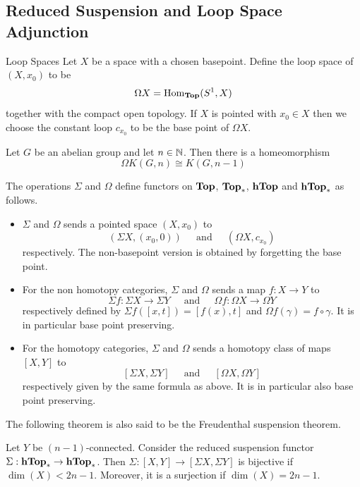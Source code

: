 \documentclass[a4paper]{article}
\begin{document}
\subsection{Reduced Suspension and Loop Space Adjunction}
\begin{defn}{Loop Spaces}{} Let $X$ be a space with a chosen basepoint. Define the loop space of $(X,x_0)$ to be $$\Omega X=\operatorname{Hom}_\bold{Top}(S^1,X)$$ together with the compact open topology. If $X$ is pointed with $x_0\in X$ then we choose the constant loop $c_{x_0}$ to be the base point of $\Omega X$. 
\end{defn}

\begin{lmm}{}{} Let $G$ be an abelian group and let $n\in\mathbb{N}$. Then there is a homeomorphism $$\Omega K(G,n)\cong K(G,n-1)$$
\end{lmm}

\begin{thm}{}{} The operations $\Sigma$ and $\Omega$ define functors on $\bold{Top}$, $\bold{Top}_\ast$, $\bold{hTop}$ and $\bold{hTop}_\ast$ as follows. 
\begin{itemize}
\item $\Sigma$ and $\Omega$ sends a pointed space $(X,x_0)$ to $$(\Sigma X,(x_0,0))\;\;\;\;\text{ and }\;\;\;\;(\Omega X,c_{x_0})$$ respectively. The non-basepoint version is obtained by forgetting the base point. 
\item For the non homotopy categories, $\Sigma$ and $\Omega$ sends a map $f:X\to Y$ to $$\Sigma f:\Sigma X\to\Sigma Y\;\;\;\;\text{ and }\;\;\;\;\Omega f:\Omega X\to\Omega Y$$ respectively defined by $\Sigma f([x,t])=[f(x),t]$ and $\Omega f(\gamma)=f\circ\gamma$. It is in particular base point preserving. 
\item For the homotopy categories, $\Sigma$ and $\Omega$ sends a homotopy class of maps $[X,Y]$ to $$[\Sigma X,\Sigma Y]\;\;\;\;\text{ and }\;\;\;\;[\Omega X,\Omega Y]$$ respectively given by the same formula as above. It is in particular also base point preserving. 
\end{itemize}
\end{thm}

The following theorem is also said to be the Freudenthal suspension theorem. 

\begin{thm}{}{} Let $Y$ be $(n-1)$-connected. Consider the reduced suspension functor $\Sigma:\bold{hTop}_\ast\to\bold{hTop}_\ast$. Then $\Sigma:[X,Y]\to[\Sigma X,\Sigma Y]$ is bijective if $\dim(X)<2n-1$. Moreover, it is a surjection if $\dim(X)=2n-1$. 
\end{thm}
\end{document}
